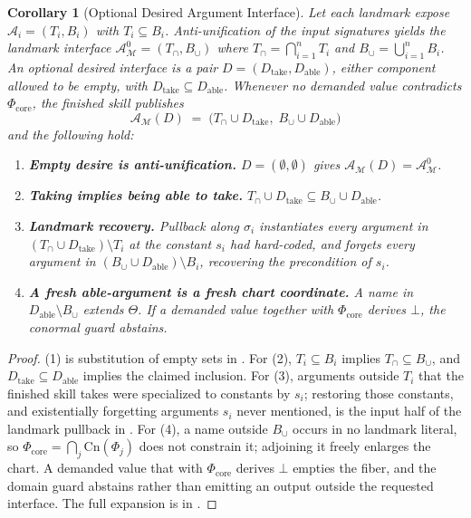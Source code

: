\documentclass[11pt]{article}
\theoremstyle{definition}
\theoremstyle{plain}
\newtheorem{corollary}{Corollary}
\newcommand{\Mcal}{\mathcal{M}}
\newcommand{\Acal}{\mathcal{A}}
\newcommand{\Phicore}{\Phi_{\mathrm{core}}}
\begin{document}
\begin{corollary}[Optional Desired Argument Interface]
\label{cor:args}
Let each landmark expose $\Acal_i = (T_i, B_i)$ with $T_i \subseteq B_i$. Anti-unification of the input signatures yields the landmark interface $\Acal_{\Mcal}^{0} = (T_{\cap}, B_{\cup})$ where $T_{\cap} = \bigcap_{i=1}^n T_i$ and $B_{\cup} = \bigcup_{i=1}^n B_i$. An optional desired interface is a pair $D = (D_{\mathrm{take}}, D_{\mathrm{able}})$, either component allowed to be empty, with $D_{\mathrm{take}} \subseteq D_{\mathrm{able}}$. Whenever no demanded value contradicts $\Phicore$, the finished skill publishes
\begin{equation}
  \Acal_{\Mcal}(D) \;=\; \big( T_{\cap} \cup D_{\mathrm{take}},\; B_{\cup} \cup D_{\mathrm{able}} \big)
  \label{eq:arg-interface}
\end{equation}
and the following hold:
\begin{enumerate}[leftmargin=1.8em,itemsep=1pt,topsep=2pt]
  \item \textbf{Empty desire is anti-unification.} $D = (\emptyset, \emptyset)$ gives $\Acal_{\Mcal}(D) = \Acal_{\Mcal}^{0}$.
  \item \textbf{Taking implies being able to take.} $T_{\cap} \cup D_{\mathrm{take}} \subseteq B_{\cup} \cup D_{\mathrm{able}}$.
  \item \textbf{Landmark recovery.} Pullback along $\sigma_i$ instantiates every argument in $(T_{\cap} \cup D_{\mathrm{take}}) \setminus T_i$ at the constant $s_i$ had hard-coded, and forgets every argument in $(B_{\cup} \cup D_{\mathrm{able}}) \setminus B_i$, recovering the precondition of $s_i$.
  \item \textbf{A fresh able-argument is a fresh chart coordinate.} A name in $D_{\mathrm{able}} \setminus B_{\cup}$ extends $\Theta$. If a demanded value together with $\Phicore$ derives $\bot$, the conormal guard abstains.
\end{enumerate}
\end{corollary}

\begin{proof}
(1) is substitution of empty sets in . For (2), $T_i \subseteq B_i$ implies $T_{\cap} \subseteq B_{\cup}$, and $D_{\mathrm{take}} \subseteq D_{\mathrm{able}}$ implies the claimed inclusion. For (3), arguments outside $T_i$ that the finished skill takes were specialized to constants by $s_i$; restoring those constants, and existentially forgetting arguments $s_i$ never mentioned, is the input half of the landmark pullback in . For (4), a name outside $B_{\cup}$ occurs in no landmark literal, so $\Phicore = \bigcap_j \mathrm{Cn}(\Phi_j)$ does not constrain it; adjoining it freely enlarges the chart. A demanded value that with $\Phicore$ derives $\bot$ empties the fiber, and the domain guard abstains rather than emitting an output outside the requested interface. The full expansion is in .
\end{proof}
\end{document}
